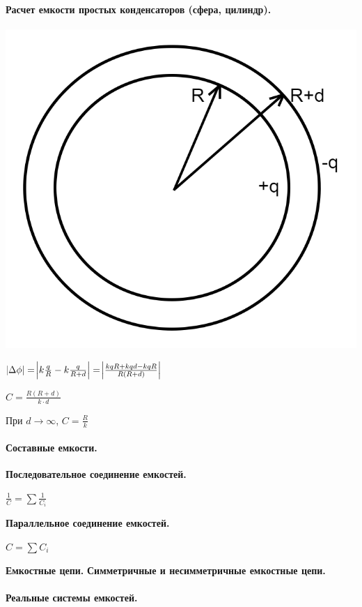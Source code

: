 \documentclass{article}
\begin{document}
            \paragraph{Расчет емкости простых конденсаторов (сфера, цилиндр).}
                \includegraphics[scale=0.2]{1_1_15_4-1.png}

                \(\abs{\Delta \phi} = \abs{k\frac{q}{R} - k\frac{q}{R+d}} = \abs{\frac{kqR+kqd-kqR}{R(R+d)}}\)

                \(C = \frac{R(R+d)}{k\cdot d}\)

                При \(d\to\infty\), \(C = \frac{R}{k}\)
            \paragraph{Составные емкости.}
                \textbf{Последовательное соединение емкостей.}
                    
                \(\frac{1}{C} = \sum{\frac{1}{C_i}}\)

                \textbf{Параллельное соединение емкостей.}
                
                \(C = \sum{C_i}\)

                \textbf{Емкостные цепи.}
                \textbf{Симметричные и несимметричные емкостные цепи.}
            \paragraph{Реальные системы емкостей.}
\end{document}
